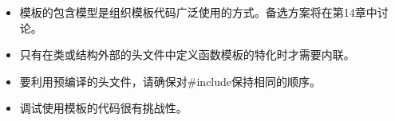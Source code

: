 
\begin{itemize}
\item 
模板的包含模型是组织模板代码广泛使用的方式。备选方案将在第14章中讨论。

\item 
只有在类或结构外部的头文件中定义函数模板的特化时才需要内联。

\item 
要利用预编译的头文件，请确保对\#include保持相同的顺序。

\item 
调试使用模板的代码很有挑战性。
\end{itemize}
